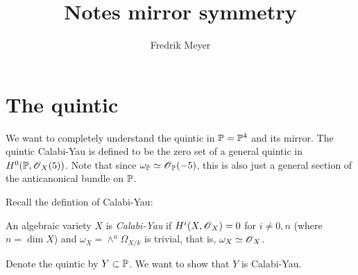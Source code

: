 \documentclass[11pt, english]{article}
\begin{document}
\title{Notes mirror symmetry}
\author{Fredrik Meyer}
\maketitle 

\section{The quintic}

We want to completely understand the quintic in $\mathbb{P}=\mathbb{P}^4$ and its mirror. The quintic Calabi-Yau is defined to be the zero set of a general quintic in $H^0(\mathbb{P}, \operatorname{\mathscr{O}}_X(5))$. Note that since $\omega_{\mathbb{P}} \simeq \operatorname{\mathscr{O}}_{\mathbb{P}}(-5)$, this is also just a general section of the anticanonical bundle on $\mathbb{P}$.

Recall the defintion of Calabi-Yau:
\begin{defi}
An algebraic variety $X$ is \emph{Calabi-Yau} if $H^i(X,\operatorname{\mathscr{O}}_X)=0$ for $i\neq 0,n$ (where $n=\dim X$) and $\omega_X=\wedge^n \Omega_{X/k}$ is trivial, that is, $\omega_X \simeq \operatorname{\mathscr{O}}_X$.
\end{defi}

Denote the quintic by $Y \subset \mathbb{P}$. We want to show that $Y$ is Calabi-Yau.
\end{document}
